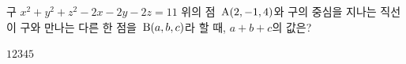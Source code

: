 구 $x^2+y^2+z^2-2x-2y-2z=11$ 위의 점~$\mathrm{A}(2{,}\mkern3mu\mathopen{}-1{,}\mkern3mu\mathopen{}4)$와 구의 중심을 지나는 직선이 구와 만나는 다른 한 점을~$\mathrm{B}(a{,}\mkern3mu\mathopen{}b{,}\mkern3mu\mathopen{}c)$라 할 때, $a+b+c$의 값은?
\begin{choices32}{$1$}{$2$}{$3$}{$4$}{$5$}\end{choices32}
